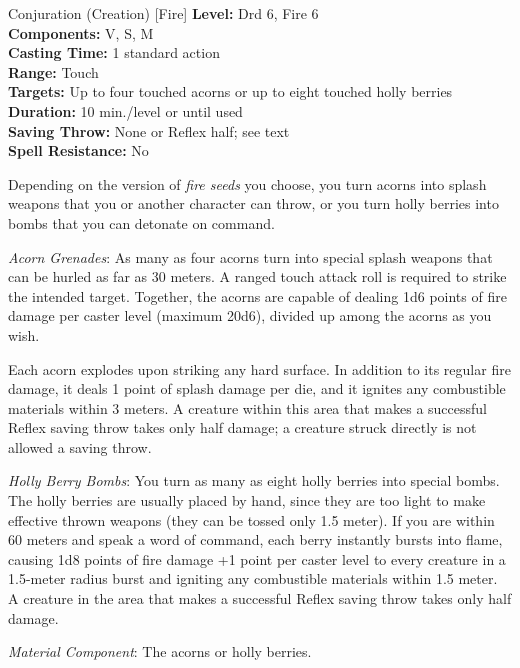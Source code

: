 {Conjuration (Creation) [Fire]}
{
	\textbf{Level:}
	Drd 6, Fire 6\\
	\textbf{Components:}
	V, S, M\\
	\textbf{Casting Time:}
	1 standard action\\
	\textbf{Range:}
	Touch\\
	\textbf{Targets:}
	Up to four touched acorns or up to eight touched holly berries\\
	\textbf{Duration:}
	10 min./level or until used\\
	\textbf{Saving Throw:}
	None or Reflex half; see text\\
	\textbf{Spell Resistance:}
	No\\
}
{
	Depending on the version of \emph{fire seeds} you choose, you turn acorns into splash weapons that you or another character can throw, or you turn holly berries into bombs that you can detonate on command.

	\textit{Acorn Grenades}:
	As many as four acorns turn into special splash weapons that can be hurled as far as 30 meters. A ranged touch attack roll is required to strike the intended target. Together, the acorns are capable of dealing 1d6 points of fire damage per caster level (maximum 20d6), divided up among the acorns as you wish.

	Each acorn explodes upon striking any hard surface. In addition to its regular fire damage, it deals 1 point of splash damage per die, and it ignites any combustible materials within 3 meters. A creature within this area that makes a successful Reflex saving throw takes only half damage; a creature struck directly is not allowed a saving throw.

	\textit{Holly Berry Bombs}:
	You turn as many as eight holly berries into special bombs. The holly berries are usually placed by hand, since they are too light to make effective thrown weapons (they can be tossed only 1.5 meter). If you are within 60 meters and speak a word of command, each berry instantly bursts into flame, causing 1d8 points of fire damage +1 point per caster level to every creature in a 1.5-meter radius burst and igniting any combustible materials within 1.5 meter. A creature in the area that makes a successful Reflex saving throw takes only half damage.

	\textit{Material Component}:
	The acorns or holly berries.

}
